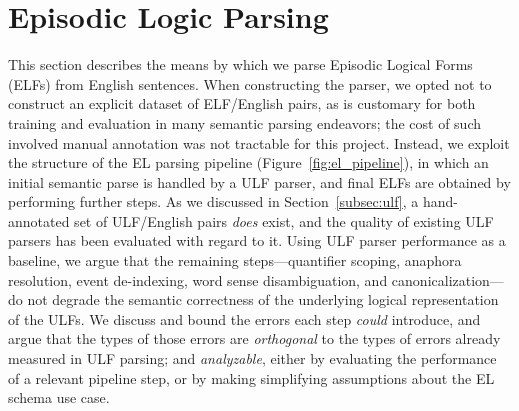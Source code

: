 

\section{Episodic Logic Parsing}
\label{sec:parsing}
This section describes the means by which we parse Episodic Logical Forms (ELFs) from English sentences. When constructing the parser, we opted not to construct an explicit dataset of ELF/English pairs, as is customary for both training and evaluation in many semantic parsing endeavors; the cost of such involved manual annotation was not tractable for this project. Instead, we exploit the structure of the EL parsing pipeline (Figure~\ref{fig:el_pipeline}), in which an initial semantic parse is handled by a ULF parser, and final ELFs are obtained by performing further steps.
As we discussed in Section~\ref{subsec:ulf}, a hand-annotated set of ULF/English pairs \textit{does} exist, and the quality of existing ULF parsers has been evaluated with regard to it.
Using ULF parser performance as a baseline, we argue that the remaining steps---quantifier scoping, anaphora resolution, event de-indexing, word sense disambiguation, and canonicalization---do not degrade the semantic correctness of the underlying logical representation of the ULFs.
We discuss and bound the errors each step \textit{could} introduce, and argue that the types of those errors are \textit{orthogonal} to the types of errors already measured in ULF parsing; and \textit{analyzable}, either by evaluating the performance of a relevant pipeline step, or by making simplifying assumptions about the EL schema use case.

